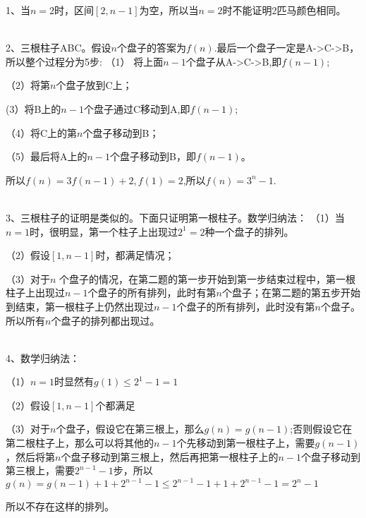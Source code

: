 \documentclass[onecolumn]{article}
\begin{document}
1、当$n=2$时，区间$[2,n-1]$为空，所以当$n=2$时不能证明2匹马颜色相同。\par
~\\
2、三根柱子ABC。假设$n$个盘子的答案为$f(n)$.最后一个盘子一定是A->C->B，所以整个过程分为5步:
（1） 将上面$n-1$个盘子从A->C->B,即$f(n-1)$; \par 
（2）将第$n$个盘子放到C上；  \par 
 (3）将B上的$n-1$个盘子通过C移动到A,即$f(n-1)$; \par 
 （4）将C上的第$n$个盘子移动到B； \par 
 （5）最后将A上的$n-1$个盘子移动到B，即$f(n-1)$。 \par 
 所以$f(n)=3f(n-1)+2, f(1)=2$,所以$f(n)=3^{n}-1$. \par 
~\\

3、三根柱子的证明是类似的。下面只证明第一根柱子。数学归纳法：
（1）当$n=1$时，很明显，第一个柱子上出现过$2^1=2$种一个盘子的排列。 \par 
（2）假设$[1,n-1]$时，都满足情况； \par 
（3）对于$n$ 个盘子的情况，在第二题的第一步开始到第一步结束过程中，第一根柱子上出现过$n-1$个盘子的所有排列，此时有第$n$个盘子；在第二题的第五步开始到结束，第一根柱子上仍然出现过$n-1$个盘子的所有排列，此时没有第$n$个盘子。所以所有$n$个盘子的排列都出现过。
\par ~\\

4、数学归纳法：\par
（1）$n=1$时显然有$g(1) \le 2^{1}-1=1$ \par 
（2）假设$[1,n-1]$个都满足 \par 
（3）对于$n$个盘子，假设它在第三根上，那么$g(n)=g(n-1)$;否则假设它在第二根柱子上，那么可以将其他的$n-1$个先移动到第一根柱子上，需要$g(n-1)$，然后将第$n$个盘子移动到第三根上，然后再把第一根柱子上的$n-1$个盘子移动到第三根上，需要$2^{n-1}-1$步，所以$g(n)=g(n-1)+1+2^{n-1}-1 \le 2^{n-1}-1+1+2^{n-1}-1=2^{n}-1$ \par
所以不存在这样的排列。
\par ~\\
\end{document}
